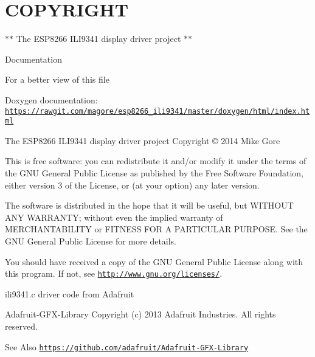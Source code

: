 \hypertarget{md_COPYRIGHT_COPYRIGHT}{}\section{C\-O\-P\-Y\-R\-I\-G\-H\-T}\label{md_COPYRIGHT_COPYRIGHT}
$\ast$$\ast$ The E\-S\-P8266 I\-L\-I9341 display driver project $\ast$$\ast$

\begin{DoxyParagraph}{Documentation}

\begin{DoxyItemize}
\item For a better view of this file
\item Doxygen documentation\-: \href{https://rawgit.com/magore/esp8266_ili9341/master/doxygen/html/index.html}{\tt https\-://rawgit.\-com/magore/esp8266\-\_\-ili9341/master/doxygen/html/index.\-html}
\end{DoxyItemize}
\end{DoxyParagraph}
\begin{DoxyParagraph}{The E\-S\-P8266 I\-L\-I9341 display driver project Copyright \copyright{} 2014 Mike Gore}

\end{DoxyParagraph}
This is free software\-: you can redistribute it and/or modify it under the terms of the G\-N\-U General Public License as published by the Free Software Foundation, either version 3 of the License, or (at your option) any later version.

The software is distributed in the hope that it will be useful, but W\-I\-T\-H\-O\-U\-T A\-N\-Y W\-A\-R\-R\-A\-N\-T\-Y; without even the implied warranty of M\-E\-R\-C\-H\-A\-N\-T\-A\-B\-I\-L\-I\-T\-Y or F\-I\-T\-N\-E\-S\-S F\-O\-R A P\-A\-R\-T\-I\-C\-U\-L\-A\-R P\-U\-R\-P\-O\-S\-E. See the G\-N\-U General Public License for more details.

You should have received a copy of the G\-N\-U General Public License along with this program. If not, see \href{http://www.gnu.org/licenses/}{\tt http\-://www.\-gnu.\-org/licenses/}.



 \begin{DoxyParagraph}{ili9341.c driver code from Adafruit}

\end{DoxyParagraph}
\begin{DoxyParagraph}{Adafruit-\/\-G\-F\-X-\/\-Library Copyright (c) 2013 Adafruit Industries. }
All rights reserved. 
\end{DoxyParagraph}
\begin{DoxySeeAlso}{See Also}
\href{https://github.com/adafruit/Adafruit-GFX-Library}{\tt https\-://github.\-com/adafruit/\-Adafruit-\/\-G\-F\-X-\/\-Library}
\end{DoxySeeAlso}




